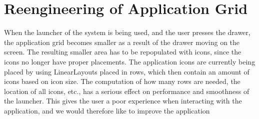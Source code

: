 
\section{Reengineering of Application Grid}
\label{sec:reengineering_of_application_grid}

When the launcher of the \giraf system is being used, and the user presses the drawer, the application grid becomes smaller as a result of the drawer moving on the screen. The resulting smaller area has to be repopulated with icons, since the icons no longer have proper placements. The application icons are currently being placed by using LinearLayouts placed in rows, which then contain an amount of icons based on icon size. The computation of how many rows are needed, the location of all icons, etc., has a serious effect on performance and smoothness of the launcher. This gives the user a poor experience when interacting with the application, and we would therefore like to improve the application 
